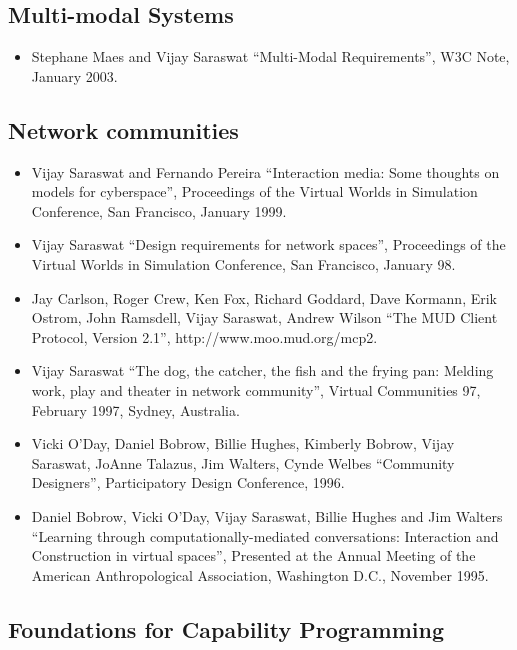 \documentclass{article}
\begin{document}
\subsection*{Multi-modal Systems}
\begin{itemize}
\item Stephane Maes and Vijay Saraswat ``Multi-Modal Requirements'', 
W3C Note, January 2003.
\end{itemize}				   

\subsection*{Network communities}
\begin{itemize}
\item Vijay Saraswat and Fernando Pereira ``Interaction media: Some
  thoughts on models for cyberspace'', Proceedings of the Virtual
  Worlds in Simulation Conference, San Francisco, January 1999.

\item  Vijay Saraswat ``Design requirements for network spaces'',
  Proceedings of the Virtual Worlds in Simulation Conference, San
  Francisco, January 98.

\item Jay Carlson, Roger Crew, Ken Fox, Richard Goddard, Dave Kormann,
  Erik Ostrom, John Ramsdell, Vijay Saraswat, Andrew Wilson ``The MUD
  Client Protocol, Version 2.1'', http://www.moo.mud.org/mcp2.

\item  Vijay Saraswat ``The dog, the catcher, the fish and the
  frying pan: Melding work, play and theater in network
  community'', Virtual Communities 97, February 1997, Sydney,
  Australia. 
  
\item  Vicki O'Day, Daniel Bobrow, Billie Hughes, Kimberly Bobrow,
  Vijay Saraswat, JoAnne Talazus, Jim Walters, Cynde Welbes
  ``Community Designers'', Participatory Design Conference, 1996.

\item  Daniel Bobrow, Vicki O'Day, Vijay Saraswat, Billie Hughes and
  Jim Walters ``Learning through computationally-mediated
  conversations: Interaction and Construction in virtual
  spaces'', Presented at the Annual Meeting of the American
  Anthropological Association, Washington D.C., November 1995.
\end{itemize}
\subsection*{Foundations for Capability Programming}
\end{document}
